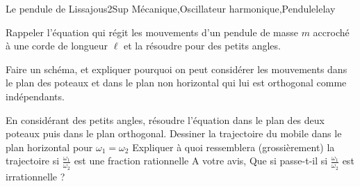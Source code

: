 \begin{exercise}{Le pendule de Lissajous}{2}{Sup}
{Mécanique,Oscillateur harmonique,Pendule}{lelay}

\begin{questions}
    \questioncours Rappeler l'équation qui régit les mouvements d'un pendule de masse $m$ accroché à une corde de longueur $\ell$ et la résoudre pour des petits angles.
    
    \question Faire un schéma, et expliquer pourquoi on peut considérer les mouvements dans le plan des poteaux et dans le plan non horizontal qui lui est orthogonal comme indépendants.

    \question En considérant des petits angles, résoudre l'équation dans le plan des deux poteaux puis dans le plan orthogonal.
    \question Dessiner la trajectoire du mobile dans le plan horizontal pour $\omega_1 = \omega_2$
    \question Expliquer à quoi ressemblera (grossièrement) la trajectoire si $\frac{\omega_1}{\omega_2}$ est une fraction rationnelle
    \question A votre avis, Que si passe-t-il si $\frac{\omega_1}{\omega_2} $ est irrationnelle ?
\end{questions}
\end{exercise}